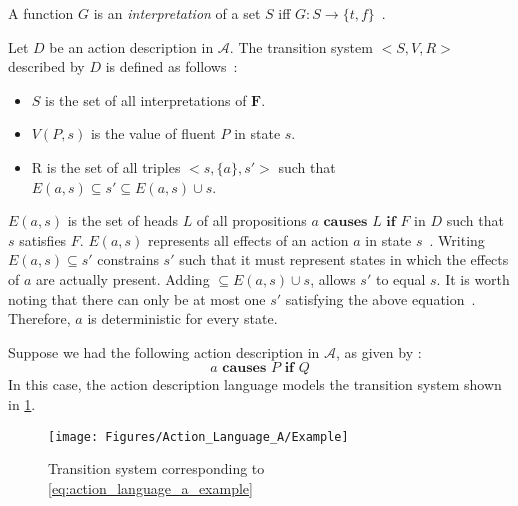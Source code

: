 \begin{definition}
    \label{def:interpretation}
    A function $G$ is an \textit{interpretation} of a set $S$ iff $G: S \rightarrow \{t, f\}$~\citep{gelfond_action_1998}.
\end{definition}

\begin{definition}
    Let $ D $ be an action description in $ \mathcal{A} $.
    The transition system $ <S, V, R> $ described by $ D $ is defined as follows~\citep{gelfond_action_1998}:

    \begin{itemize}
        \item $ S $ is the set of all interpretations of $ \boldsymbol{F} $.
        \item $ V(P, s) $ is the value of fluent $P$ in state $s$.
        \item R is the set of all triples $ <s, \{a\}, s'> $ such that $ E(a,s) \subseteq s' \subseteq E(a,s) \cup s $.
    \end{itemize}
\end{definition}

$ E(a, s) $ is the set of heads $ L $ of all propositions $ a \textbf{ causes } L \textbf{ if } F $ in $ D $ such that $ s $ satisfies $ F $.
$ E(a, s) $ represents all effects of an action $ a $ in state $ s $~\citep{gelfond_action_1998}.
Writing $ E\left(a,s\right)\subseteq s' $ constrains $ s' $ such that it must represent states in which the effects of $ a $ are actually present.
Adding $ \subseteq E\left(a,s\right)\cup s $, allows $ s' $ to equal $ s $.
It is worth noting that there can only be at most one $ s' $ satisfying the above equation~\citep{gelfond_action_1998}.
Therefore, $ a $ is deterministic for every state.

Suppose we had the following action description in $\mathcal{A}$, as given by \citet{gelfond_action_1998}:
\begin{equation}
    \label{eq:action_language_a_example}
    a \textbf{ causes } P \textbf{ if } Q
\end{equation}
In this case, the action description language models the transition system shown in \cref{fig:action_language_a_example}.

\begin{figure}[h]
    \centering
    \texttt{[image: Figures/Action\_Language\_A/Example]}
    \caption{Transition system corresponding to \cref{eq:action_language_a_example}}
    \label{fig:action_language_a_example}
\end{figure}


